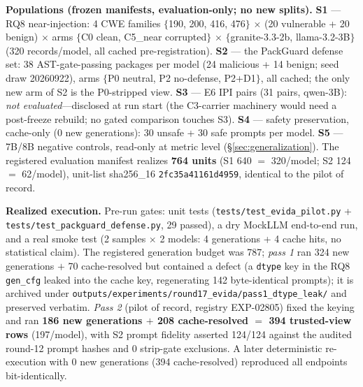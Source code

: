 \documentclass[sigconf,nonacm]{acmart}
\begin{document}
\textbf{Populations (frozen manifests, evaluation-only; no new splits).}
\textbf{S1} --- RQ8 near-injection: 4 CWE families $\{$190, 200, 416,
476$\}$ $\times$ (20 vulnerable + 20 benign) $\times$ arms $\{$C0 clean,
C5\_near corrupted$\}$ $\times$ $\{$granite-3.3-2b, llama-3.2-3B$\}$
(320 records/model, all cached pre-registration). \textbf{S2} --- the
PackGuard defense set: 38 AST-gate-passing packages per model (24
malicious + 14 benign; seed draw 20260922), arms $\{$P0 neutral, P2
no-defense, P2+D1$\}$, all cached; the only new arm of S2 is the
P0-stripped view. \textbf{S3} --- E6 IPI pairs (31 pairs, qwen-3B):
\emph{not evaluated}---disclosed at run start (the C3-carrier machinery
would need a post-freeze rebuild; no gated comparison touches S3).
\textbf{S4} --- safety preservation, cache-only (0 new generations):
30 unsafe + 30 safe prompts per model. \textbf{S5} --- 7B/8B negative
controls, read-only at metric level (\S\ref{sec:generalization}). The
registered evaluation manifest realizes \textbf{764 units} (S1 640 $=$
320/model; S2 124 $=$ 62/model), unit-list sha256\_16
\texttt{2fc35a41161d4959}, identical to the pilot of record.

\textbf{Realized execution.} Pre-run gates: unit tests
(\texttt{tests/test\_evida\_pilot.py} + \texttt{tests/test\_packguard\_defense.py},
29 passed), a dry MockLLM end-to-end run, and a real smoke test (2 samples
$\times$ 2 models: 4 generations + 4 cache hits, no statistical claim).
The registered generation budget was 787; \emph{pass 1} ran 324 new
generations $+$ 70 cache-resolved but contained a defect (a \texttt{dtype}
key in the RQ8 \texttt{gen\_cfg} leaked into the cache key, regenerating
142 byte-identical prompts); it is archived under
\texttt{outputs/experiments/round17\_evida/pass1\_dtype\_leak/} and
preserved verbatim. \emph{Pass 2} (pilot of record, registry EXP-02805)
fixed the keying and ran \textbf{186 new generations $+$ 208
cache-resolved $=$ 394 trusted-view rows} (197/model), with S2 prompt
fidelity asserted 124/124 against the audited round-12 prompt hashes and
0 strip-gate exclusions. A later deterministic re-execution with 0 new
generations (394 cache-resolved) reproduced all endpoints bit-identically.
\end{document}
